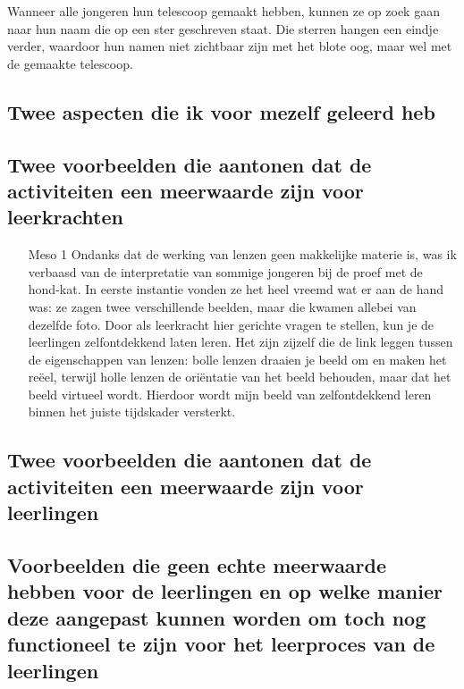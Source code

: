\documentclass[a4paper,12pt,twoside]{article}%
\begin{document}
	Wanneer alle jongeren hun telescoop gemaakt hebben, kunnen ze op zoek gaan naar hun naam die op een ster geschreven staat. Die sterren hangen een eindje verder, waardoor hun namen niet zichtbaar zijn met het blote oog, maar wel met de gemaakte telescoop. 
	
	\subsection{Twee aspecten die ik voor mezelf geleerd heb}
	
	\subsection{Twee voorbeelden die aantonen dat de activiteiten een meerwaarde zijn voor leerkrachten}
	\begin{itemize}[labelwidth=3em,leftmargin =\dimexpr{}+\relax]
		\item[Meso 1] Ondanks dat de werking van lenzen geen makkelijke materie is, was ik verbaasd van de interpretatie van sommige jongeren bij de proef met de hond-kat. In eerste instantie vonden ze het heel vreemd wat er aan de hand was: ze zagen twee verschillende beelden, maar die kwamen allebei van dezelfde foto. Door als leerkracht hier gerichte vragen te stellen, kun je de leerlingen zelfontdekkend laten leren. Het zijn zijzelf die de link leggen tussen de eigenschappen van lenzen: bolle lenzen draaien je beeld om en maken het reëel, terwijl holle lenzen de oriëntatie van het beeld behouden, maar dat het beeld virtueel wordt. Hierdoor wordt mijn beeld van zelfontdekkend leren  binnen het juiste tijdskader versterkt.
	\end{itemize}
	
	\subsection{Twee voorbeelden die aantonen dat de activiteiten een meerwaarde zijn voor leerlingen}
	
	
	\subsection{Voorbeelden die geen echte meerwaarde hebben voor de  leerlingen en op welke manier deze aangepast kunnen worden om toch nog functioneel te zijn voor het leerproces van de leerlingen}
	
	
	
	
	
\end{document}
